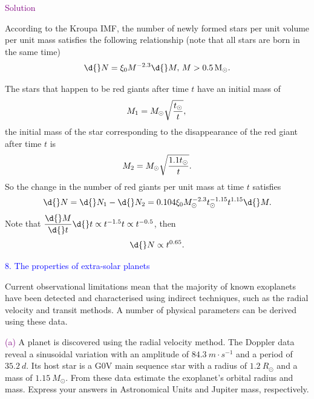 \documentclass[UTF8, 12pt, a4paper, oneside, twocolumn, fontset=none]{ctexart}
\begin{document}
\hspace*{\fill}

\noindent\textcolor{purple}{Solution}

According to the Kroupa IMF, the number of newly formed stars per unit volume per unit mass satisfies the following relationship (note that all stars are born in the same time)
\begin{equation}
\d{}N=\xi_{0}M^{-2.3}\d{}M,\, M>\qty{0.5}{M_{\odot}}.\notag
\end{equation}

The stars that happen to be red giants after time $t$ have an initial mass of
\begin{equation}
M_{1}=M_{\odot}\sqrt{\frac{t_{\odot}}{t}},\notag\\
\end{equation}
the initial mass of the star corresponding to the disappearance of the red giant after time $t$ is
\begin{equation}
M_{2}=M_{\odot}\sqrt{\frac{1.1t_{\odot}}{t}}.\notag\\
\end{equation}
So the change in the number of red giants per unit mass at time $t$ satisfies
\begin{equation}
\d{}N=\d{}N_{1}-\d{}N_{2}=0.104\xi_{0}M_{\odot}^{-2.3}t_{\odot}^{-1.15}t^{1.15}\d{}M.\notag
\end{equation}
Note that $\dfrac{\d{}M}{\d{}t}\d{}t\propto{}t^{-1.5}t\propto{}t^{-0.5}$, then
\begin{equation}
\d{}N\propto{}t^{0.65}.\notag
\end{equation}

\hspace*{\fill}

\noindent\textcolor{blue}{8. The properties of extra-solar planets}

\noindent Current observational limitations mean that the majority of known exoplanets have been detected and characterised using indirect techniques, such as the radial velocity and transit methods. A number of physical parameters can be derived using these data.

\hspace*{\fill}

\noindent\textcolor{purple}{(a)} A planet is discovered using the radial velocity method. The Doppler data reveal a sinusoidal variation with an amplitude of $\qty{84.3}{m\cdot{}s^{-1}}$ and a period of $\qty{35.2}{d}$. Its host star is a G0V main sequence star with a radius of $\qty{1.2}{R_{\odot}}$ and a mass of $\qty{1.15}{M_{\odot}}$. From these data estimate the exoplanet's orbital radius and mass. Express your answers in Astronomical Units and Jupiter mass, respectively.
\end{document}
